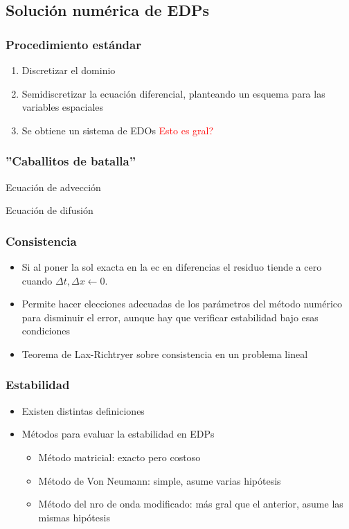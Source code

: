 \documentclass[aps,prb,twocolumn,superscriptaddress,floatfix,longbibliography]{revtex4-2}
\newcounter{para}
\begin{document}
\subsection{Solución numérica de EDPs}

\subsubsection{Procedimiento estándar}
\begin{enumerate}
    \item Discretizar el dominio
    \item Semidiscretizar la ecuación diferencial, planteando un esquema para las variables espaciales
    \item Se obtiene un sistema de EDOs \textcolor{red}{Esto es gral?}
\end{enumerate}


\subsubsection{''Caballitos de batalla''}
Ecuación de advección

Ecuación de difusión

\subsubsection{Consistencia}
\begin{itemize}
    \item Si al poner la sol exacta en la ec en diferencias el residuo tiende a cero cuando $\Delta t, \Delta x \leftarrow 0$.
    \item Permite hacer elecciones adecuadas de los parámetros del método numérico para disminuir el error, aunque hay que verificar estabilidad bajo esas condiciones
    \item Teorema de Lax-Richtryer sobre consistencia en un problema lineal
\end{itemize}

\subsubsection{Estabilidad}
\begin{itemize}
    \item Existen distintas definiciones
    \item Métodos para evaluar la estabilidad en EDPs
    \begin{itemize}
        \item Método matricial: exacto pero costoso
        \item Método de Von Neumann: simple, asume varias hipótesis
        \item Método del nro de onda modificado: más gral que el anterior, asume las mismas hipótesis
    \end{itemize}
\end{itemize}
\end{document}
